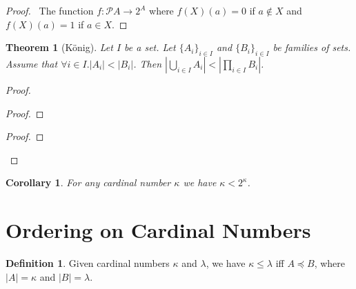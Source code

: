 \documentclass{book}
\let\qed\relax
\newtheorem{cor}{Corollary}[ax]
\newtheorem{thm}[ax]{Theorem}
\theoremstyle{definition}
\newtheorem{df}[ax]{Definition}
\newcommand{\ran}{\ensuremath{\operatorname{ran}}}
\begin{document}
\begin{proof}
\pf\ The function $f : \mathcal{P} A \rightarrow 2^A$ where $f(X)(a) = 0$ if $a \notin X$ and $f(X)(a) = 1$ if $a \in X$. \qed
\end{proof}

\begin{thm}[K\"{o}nig]
Let $I$ be a set. Let $\{A_i\}_{i \in I}$ and $\{B_i\}_{i \in I}$ be families of sets. Assume that $\forall i \in I. |A_i| < |B_i|$. Then $\left| \bigcup_{i \in I} A_i \right| < \left| \prod_{i \in I} B_i \right|$.
\end{thm}

\begin{proof}
\pf
{}
\begin{proof}
\end{proof}
\begin{proof}
	\step{d}{$c \notin \ran h$}
\end{proof}
\qed
\end{proof}

\begin{cor}
For any cardinal number $\kappa$ we have $\kappa < 2^\kappa$.
\end{cor}

\section{Ordering on Cardinal Numbers}

\begin{df}
Given cardinal numbers $\kappa$ and $\lambda$, we have $\kappa \leq \lambda$ iff $A \preccurlyeq B$, where $|A| = \kappa$ and $|B| = \lambda$.
\end{df}
\end{document}

